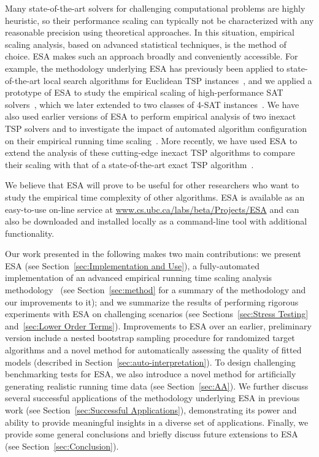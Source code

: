 \documentclass[aic]{iosart2x}
\begin{document}
Many state-of-the-art solvers for challenging computational problems are highly heuristic, so their performance scaling can typically not be characterized with any reasonable precision using theoretical approaches.
In this situation, empirical scaling analysis, based on advanced statistical techniques, is the method of choice. 
ESA makes such an approach broadly and conveniently accessible. 
For example, the methodology underlying ESA has previously been applied to state-of-the-art local search algorithms for Euclidean TSP instances~\cite{DubEtAl15}, and we applied a prototype of ESA to study the empirical scaling of high-performance SAT solvers~\cite{MuHoo15}, which we later extended to two classes of 4-SAT instances~\cite{Mu15}. 
We have also used earlier versions of ESA to perform empirical analysis of two inexact TSP solvers and to investigate the impact of automated algorithm configuration on their empirical running time scaling~\cite{MuEtAl16,Mu15}. 
More recently, we have used ESA to extend the analysis of these cutting-edge inexact TSP algorithms to compare their scaling with that of a state-of-the-art exact TSP algorithm~\cite{MuEtAl17}.

We believe that ESA will prove to be useful for other researchers who want to study the empirical time complexity of other algorithms. ESA is available as an easy-to-use on-line service at \url{www.cs.ubc.ca/labs/beta/Projects/ESA} and can also be downloaded and installed locally as a command-line tool with additional functionality.

Our work presented in the following makes two main contributions: 
we present ESA (see Section~\ref{sec:Implementation and Use}), a fully-automated implementation of an advanced empirical running time scaling analysis methodology~\cite{Hoo09} (see Section~\ref{sec:method} for a summary of the methodology and our improvements to it); and we summarize the results of performing rigorous experiments with ESA on challenging scenarios (see Sections~\ref{sec:Stress Testing} and~\ref{sec:Lower Order Terms}). 
Improvements to ESA over an earlier, preliminary version include a nested bootstrap sampling procedure for randomized target algorithms and a novel method for automatically assessing the quality of fitted models (described in Section~\ref{sec:auto-interpretation}). 
To design challenging benchmarking tests for ESA, we also introduce a novel method for artificially generating realistic running time data (see Section~\ref{sec:AA}). 
We further discuss several successful applications of the methodology underlying ESA in previous work (see Section~\ref{sec:Successful Applications}), demonstrating its power and ability to provide meaningful insights in a diverse set of applications. 
Finally, we provide some general conclusions and briefly discuss future extensions to ESA (see Section~\ref{sec:Conclusion}).
\end{document}
